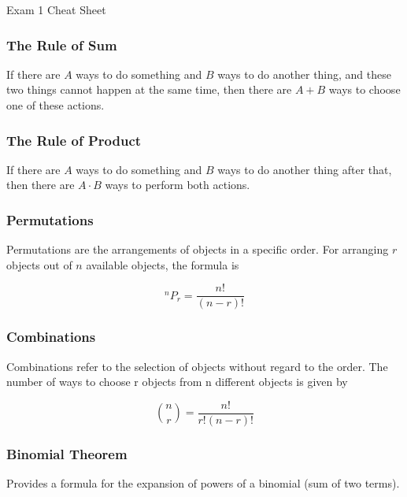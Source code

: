 \begin{cheatsheet}{Exam 1 Cheat Sheet}
    \subsubsection*{The Rule of Sum}

    If there are $A$ ways to do something and $B$ ways to do another thing, and these two things cannot happen at the same time, then there are $A + B$ ways to choose one of these actions.

    \subsubsection*{The Rule of Product}

    If there are $A$ ways to do something and $B$ ways to do another thing after that, then there are $A \cdot B$ ways to perform both actions.

    \subsubsection*{Permutations}

    Permutations are the arrangements of objects in a specific order. For arranging $r$ objects out of $n$ available objects, the formula is

    \begin{equation*}
        ^{n}P_{r} = \frac{n!}{(n - r)!}
    \end{equation*}

    \subsubsection*{Combinations}

    Combinations refer to the selection of objects without regard to the order. The number of ways to choose r objects from n different objects is given by

    \begin{equation*}
        {n \choose r} = \frac{n!}{r!(n - r)!}
    \end{equation*}

    \subsubsection*{Binomial Theorem}

    Provides a formula for the expansion of powers of a binomial (sum of two terms).


\end{cheatsheet}
